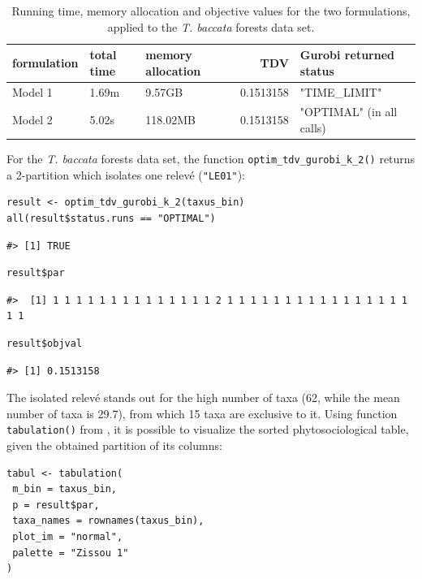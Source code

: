 \begin{table}
\centering
\caption{\label{tab:benchmark-latex}Running time, memory allocation and objective values for the two formulations, applied to the \emph{T. baccata} forests data set.}
\centering
\fontsize{7}{9}\selectfont
\begin{tabular}[t]{l|l|l|r|l}
\hline
formulation & total time & memory allocation & TDV & Gurobi returned status\\
\hline
Model 1 & 1.69m & 9.57GB & 0.1513158 & "TIME\_LIMIT"\\
\hline
Model 2 & 5.02s & 118.02MB & 0.1513158 & "OPTIMAL" (in all calls)\\
\hline
\end{tabular}
\end{table}

For the \emph{T. baccata} forests data set, the function \texttt{optim\_tdv\_gurobi\_k\_2()} returns a 2-partition which isolates one relevé (\texttt{"LE01"}):

\begin{verbatim}
result <- optim_tdv_gurobi_k_2(taxus_bin)
all(result$status.runs == "OPTIMAL")
\end{verbatim}

\begin{verbatim}
#> [1] TRUE
\end{verbatim}

\begin{verbatim}
result$par
\end{verbatim}

\begin{verbatim}
#>  [1] 1 1 1 1 1 1 1 1 1 1 1 1 1 1 2 1 1 1 1 1 1 1 1 1 1 1 1 1 1 1 1 1 1
\end{verbatim}

\begin{verbatim}
result$objval
\end{verbatim}

\begin{verbatim}
#> [1] 0.1513158
\end{verbatim}

The isolated relevé stands out for the high number of taxa (62, while the mean number of taxa is 29.7), from which 15 taxa are exclusive to it. Using function \texttt{tabulation()} from , it is possible to visualize the sorted phytosociological table, given the obtained partition of its columns:

\begin{verbatim}
tabul <- tabulation(
 m_bin = taxus_bin,
 p = result$par,
 taxa_names = rownames(taxus_bin),
 plot_im = "normal",
 palette = "Zissou 1"
)
\end{verbatim}

